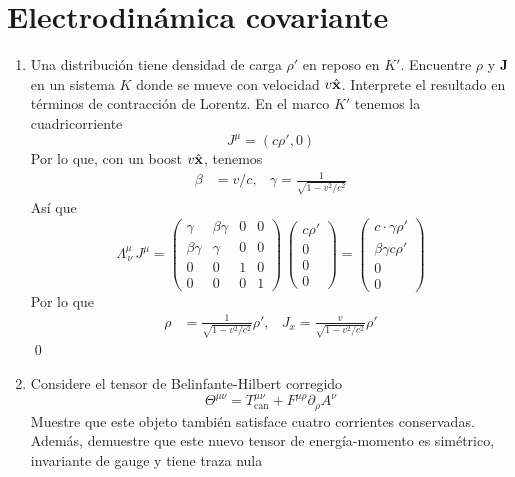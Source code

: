 \documentclass[]{article}
\numberwithin{equation}{section}
\begin{document}
\section{Electrodinámica covariante}
\begin{enumerate}
	\item Una distribución tiene densidad de carga $\rho'$ en reposo en $K'$. Encuentre $\rho$ y $\mathbf{J}$ en un sistema $K$ donde se mueve con velocidad $v\hat{\mathbf{x}}$. Interprete el resultado en términos de contracción de Lorentz.
	\resp En el marco $K'$ tenemos la cuadricorriente
	\begin{equation}
		J^{\mu} = (c\rho',0)
	\end{equation}
	Por lo que, con un boost $v\hat{\mathbf{x}}$, tenemos
	\begin{align*}
		\beta &= v/c, & \gamma = \frac{1}{\sqrt{1 - v^2/c^2}}
	\end{align*}
	Así que
	\begin{equation}
		\Lambda^\mu_{\,\nu} \, J^\mu = \begin{pmatrix}
			\gamma & \beta\gamma & 0 & 0\\
			\beta\gamma & \gamma & 0 & 0\\
			0 & 0 & 1 & 0\\
			0 & 0 & 0 & 1
		\end{pmatrix} \, \begin{pmatrix}
			c\rho'\\
			0\\
			0\\
			0
		\end{pmatrix} = \begin{pmatrix}
			c \cdot \gamma \rho'\\
			\beta \gamma c \rho'\\
			0\\
			0
		\end{pmatrix}
	\end{equation}
	Por lo que
	\begin{align}
		\rho &= \frac{1}{\sqrt{1 - v^2/c^2}} \rho', & J_x = \frac{v}{\sqrt{1 - v^2/c^2}} \rho'
	\end{align}
	\qed
	
	\item Considere el tensor de Belinfante-Hilbert corregido
	\begin{equation}
		\Theta^{\mu\nu} = T_\mathrm{can}^{\mu\nu} + F^{\mu\rho} \partial_\rho A^\nu
	\end{equation}
	Muestre que este objeto también satisface cuatro corrientes conservadas. Además, demuestre que este nuevo tensor de energía-momento es simétrico, invariante de gauge y tiene traza nula
	\resp 
	
	
	
	
	
	
	
\end{enumerate}
\end{document}

